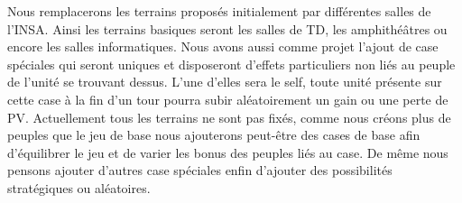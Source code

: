 Nous remplacerons les terrains proposés initialement par différentes salles de l'INSA. Ainsi les terrains basiques seront les salles de TD, les amphithéâtres ou encore les salles informatiques. Nous avons aussi comme projet l'ajout de case spéciales qui seront uniques et disposeront d'effets particuliers non liés au peuple de l'unité se trouvant dessus. L'une d'elles sera le self, toute unité présente sur cette case à la fin d'un tour pourra subir aléatoirement un gain ou une perte de PV.
Actuellement tous les terrains ne sont pas fixés, comme nous créons plus de peuples que le jeu de base nous ajouterons peut-être des cases  de base afin d'équilibrer le jeu et de varier les bonus des peuples liés au case. De même nous pensons ajouter d'autres case spéciales enfin d'ajouter des possibilités stratégiques ou aléatoires.